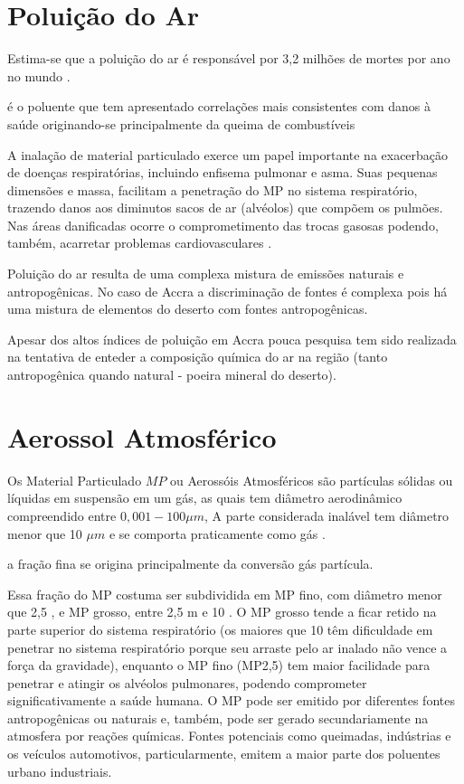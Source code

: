 
\section{Poluição do Ar}

Estima-se que a poluição do ar é responsável por 
3,2 milhões de mortes por ano no mundo \cite{lim2013}. 

é o poluente que tem apresentado correlações mais consistentes com
 danos à saúde originando-se principalmente da queima de combustíveis

A inalação de material particulado exerce um papel importante na 
exacerbação de doenças respiratórias, incluindo enfisema pulmonar e asma. 
Suas pequenas dimensões e massa, facilitam a penetração do MP no sistema 
respiratório, trazendo danos aos diminutos sacos de ar (alvéolos) que 
compõem os pulmões. Nas áreas danificadas ocorre o comprometimento das 
trocas gasosas podendo, também, acarretar problemas cardiovasculares
\cite{arbex2012}.

Poluição do ar resulta de uma complexa mistura de emissões naturais e 
antropogênicas. No caso de Accra a discriminação de fontes é complexa pois
há uma mistura de elementos do deserto com fontes antropogênicas.

Apesar dos altos índices de poluição em Accra pouca pesquisa tem sido 
realizada na tentativa de enteder a composição química do ar na região
(tanto antropogênica quando natural - poeira mineral do deserto). 






\section{Aerossol Atmosférico}

Os Material Particulado $MP$ ou  Aerossóis Atmosféricos são partículas
sólidas ou líquidas em suspensão em um gás, as quais tem diâmetro 
aerodinâmico compreendido  entre $0,001-100\mu m$, 
A parte considerada inalável tem diâmetro menor que 10 $\mu m$
e se comporta praticamente como gás \cite{seinfeld1998}.

a fração fina se origina principalmente da conversão gás partícula. 

Essa fração do MP costuma ser subdividida em MP fino, com diâmetro menor que 2,5 , e MP grosso, entre  2,5 m e 10 . O MP grosso tende a ficar retido na parte superior do sistema respiratório (os maiores que 10 têm dificuldade em penetrar no sistema respiratório porque seu arraste pelo ar inalado não vence a força da gravidade), enquanto o MP fino (MP2,5) tem maior facilidade para penetrar e atingir os alvéolos pulmonares, podendo comprometer significativamente a saúde humana. O MP pode ser emitido por diferentes fontes antropogênicas ou naturais e, também, pode ser gerado secundariamente na atmosfera por reações químicas. Fontes potenciais como queimadas,  indústrias e os veículos automotivos, particularmente, emitem a maior parte dos poluentes urbano industriais.
 	


